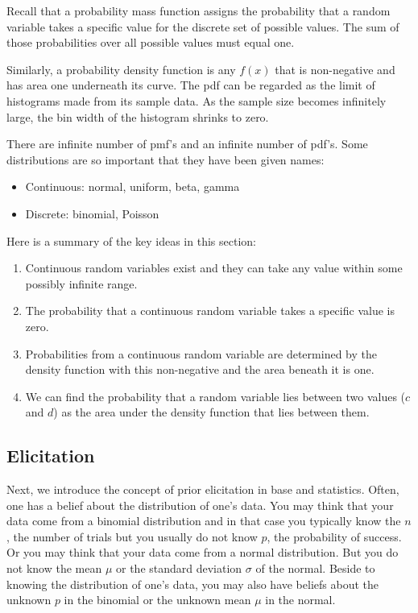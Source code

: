 \documentclass[]{book}
\theoremstyle{definition}
\theoremstyle{definition}
\theoremstyle{definition}
\theoremstyle{remark}
\begin{document}
Recall that a probability mass function assigns the probability that a
random variable takes a specific value for the discrete set of possible
values. The sum of those probabilities over all possible values must
equal one.

Similarly, a probability density function is any \(f(x)\) that is
non-negative and has area one underneath its curve. The pdf can be
regarded as the limit of histograms made from its sample data. As the
sample size becomes infinitely large, the bin width of the histogram
shrinks to zero.

There are infinite number of pmf's and an infinite number of pdf's. Some
distributions are so important that they have been given names:

\begin{itemize}
\item
  Continuous: normal, uniform, beta, gamma
\item
  Discrete: binomial, Poisson
\end{itemize}

Here is a summary of the key ideas in this section:

\begin{enumerate}
\def\labelenumi{\arabic{enumi}.}
\item
  Continuous random variables exist and they can take any value within
  some possibly infinite range.
\item
  The probability that a continuous random variable takes a specific
  value is zero.
\item
  Probabilities from a continuous random variable are determined by the
  density function with this non-negative and the area beneath it is
  one.
\item
  We can find the probability that a random variable lies between two
  values (\(c\) and \(d\)) as the area under the density function that
  lies between them.
\end{enumerate}

\subsection{Elicitation}\label{elicitation}

Next, we introduce the concept of prior elicitation in base and
statistics. Often, one has a belief about the distribution of one's
data. You may think that your data come from a binomial distribution and
in that case you typically know the \(n\), the number of trials but you
usually do not know \(p\), the probability of success. Or you may think
that your data come from a normal distribution. But you do not know the
mean \(\mu\) or the standard deviation \(\sigma\) of the normal. Beside
to knowing the distribution of one's data, you may also have beliefs
about the unknown \(p\) in the binomial or the unknown mean \(\mu\) in
the normal.
\end{document}
